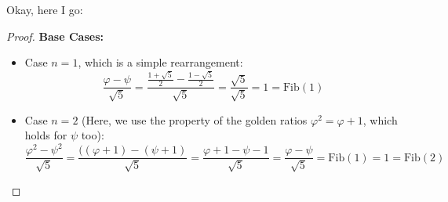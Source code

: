 \documentclass{sicp}
\date{August 15, 2024}
\newcommand{\Fib}{\mathrm{Fib}}
\begin{document}
\maketitle


Okay, here I go:

\begin{proof}
	\textbf{Base Cases:}
	\begin{itemize}
		\item Case ${n = 1}$, which is a simple rearrangement:
		      \[
			      \frac{\varphi - \psi}{\sqrt{5}} = \frac{\frac{1 + \sqrt{5}}{2} - \frac{1 - \sqrt{5}}{2}}{\sqrt{5}} = \frac{\sqrt{5}}{\sqrt{5}} = 1 = \Fib(1)
		      \]
		\item Case ${n = 2}$ (Here, we use the property of the golden ratios $\varphi^2 = \varphi + 1$, which holds for $\psi$ too):
		      \[
			      \frac{\varphi^2 - \psi^2}{\sqrt{5}} = \frac{((\varphi + 1) - (\psi + 1)}{\sqrt{5}} = \frac{\varphi + 1 - \psi - 1}{\sqrt{5}} = \frac{\varphi - \psi}{\sqrt{5}} = \Fib(1) = 1 = \Fib(2)
		      \]
	\end{itemize}


\end{proof}
\end{document}
